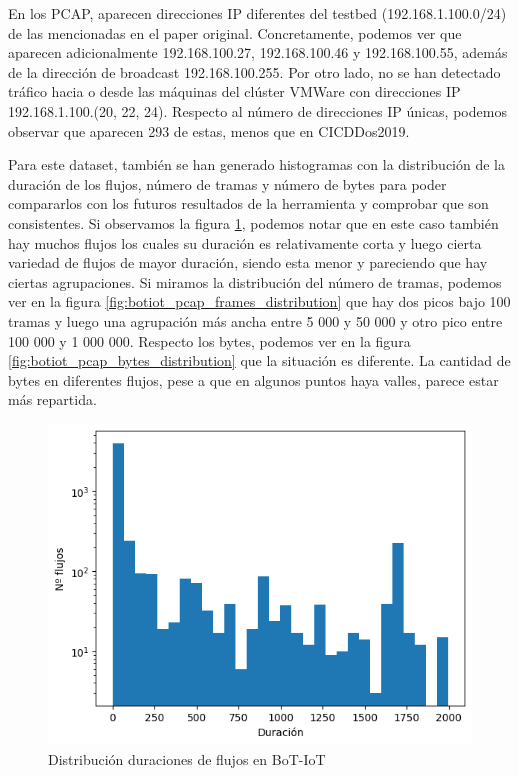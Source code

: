 En los PCAP, aparecen direcciones IP diferentes del testbed (192.168.1.100.0/24) de las mencionadas en el paper original. Concretamente, podemos ver que aparecen adicionalmente 192.168.100.27, 192.168.100.46 y 192.168.100.55, además de la dirección de broadcast 192.168.100.255. Por otro lado, no se han detectado tráfico hacia o desde las máquinas del clúster VMWare con direcciones IP 192.168.1.100.(20, 22, 24). Respecto al número de direcciones IP únicas, podemos observar que aparecen 293 de estas, menos que en CICDDos2019.


Para este dataset, también se han generado histogramas con la distribución de la duración de los flujos, número de tramas y número de bytes para poder compararlos con los futuros resultados de la herramienta y comprobar que son consistentes. Si observamos la figura \ref{fig:botiot_pcap_duration_distribution}, podemos notar que en este caso también hay muchos flujos los cuales su duración es relativamente corta y luego cierta variedad de flujos de mayor duración, siendo esta menor y pareciendo que hay ciertas agrupaciones. Si miramos la distribución del número de tramas, podemos ver en la figura \ref{fig:botiot_pcap_frames_distribution} que hay dos picos bajo 100 tramas y luego una agrupación más ancha entre 5 000 y  50 000 y otro pico entre 100 000 y 1 000 000. Respecto los bytes, podemos ver en la figura \ref{fig:botiot_pcap_bytes_distribution} que la situación es diferente. La cantidad de bytes en diferentes flujos, pese a que en algunos puntos haya valles, parece estar más repartida.


\begin{figure}[H]
    \begin{center}
        \includegraphics[width=0.40\linewidth]{media/botiot_pcap_duration_distribution.png}
    \end{center}
    \captionsetup{justification=centering}
    \caption{Distribución duraciones de flujos en BoT-IoT}\label{fig:botiot_pcap_duration_distribution}
\end{figure}


